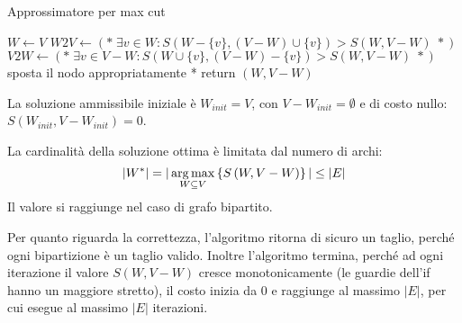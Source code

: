 \begin{algorithm}[H]
\caption{Approssimatore per max cut}\label{alg:nc_approx}
\begin{algorithmic}[1]
        \State $W \gets V$
        \State $W2V \gets 
                \left( 
                    * \;
                    \exists v \in W :
                    S \left( W -
                    \{ v \},
                    \left( V-W \right)
                    \cup
                    \{ v \}
                    \right)
                    >
                    S \left( W, V-W \right)
                    \; *
                \right)
            $
        \State $V2W \gets 
                \left( 
                    * \;
                    \exists v \in V-W :
                    S \left( W
                    \cup
                    \{ v \},
                    \left( V-W \right)
                    -
                    \{ v \}
                    \right)
                    >
                    S \left( W, V-W \right)
                    \; *
                \right)
            $
                \State * sposta il nodo appropriatamente *
            \Else
                \State return $ \left( W, V-W \right) $
            \EndIf
        \EndWhile
    \EndProcedure
\end{algorithmic}
\end{algorithm}

La soluzione ammissibile iniziale è $
W_{init}
= V
$, con $
V-W_{init} = \emptyset
$ e di costo nullo: $
S \left( W_{init} , V- W_{init} \right)
= 0
$.

La cardinalità della soluzione ottima è limitata dal numero di archi:
\begin{equation*}
    |
    W^*
    |
    =
    |
    \operatorname*{arg\,max}_{W \subseteq V}
    \left\{ 
        S \left( W, V-W \right)
    \right\}
    |
    \leq |E|
\end{equation*}
Il valore si raggiunge nel caso di grafo bipartito.

Per quanto riguarda la correttezza, l'algoritmo ritorna di sicuro un taglio, perché ogni bipartizione è un taglio valido.
Inoltre l'algoritmo termina, perché ad ogni iterazione il valore $
S \left( W, V-W \right)
$ cresce monotonicamente (le guardie dell'if hanno un maggiore stretto), il costo inizia da 0 e raggiunge al massimo $|E|$, per cui esegue al massimo $|E|$ iterazioni.


